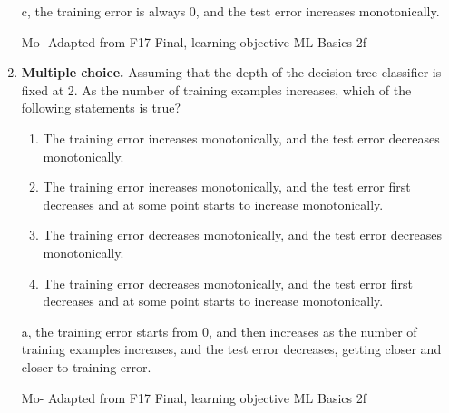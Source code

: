 \begin{enumerate}
    \begin{soln}
    c, the training error is always 0, and the test error increases monotonically. 
    \end{soln}
    
    \begin{qauthor}
    Mo- Adapted from F17 Final, learning objective ML Basics 2f
    \end{qauthor}
    
   \item{} \textbf{Multiple choice.} Assuming that the depth of the decision tree classifier is fixed at 2. As the number of training examples increases, which of the following statements is true?
    \begin{enumerate}
    \item The training error increases monotonically, and the test error decreases monotonically. 
    \item The training error increases monotonically, and the test error first decreases and at some point starts to increase monotonically. 
    \item The training error decreases monotonically, and the test error decreases monotonically. 
    \item The training error decreases monotonically, and the test error first decreases and at some point starts to increase monotonically. 
    \end{enumerate}
    
    \begin{soln}
    a, the training error starts from 0, and then increases as the number of training examples increases, and the test error decreases, getting closer and closer to training error. 
    \end{soln}
    
    \begin{qauthor}
    Mo- Adapted from F17 Final, learning objective ML Basics 2f
    \end{qauthor}
    
     
\end{enumerate}
    
